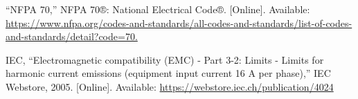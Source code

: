 \documentclass[12pt]{article}
\begin{document}
\begin{thebibliography}{9}
    “NFPA 70,” NFPA 70®: National Electrical Code®. [Online]. Available: \url{https://www.nfpa.org/codes-and-standards/all-codes-and-standards/list-of-codes-and-standards/detail?code=70.} 
    
    IEC, “Electromagnetic compatibility (EMC) - Part 3-2: Limits - Limits for harmonic current emissions (equipment input current 16 A per phase),” IEC Webstore, 2005. [Online]. Available:
    \url{https://webstore.iec.ch/publication/4024}
\end{thebibliography}
\end{document}
